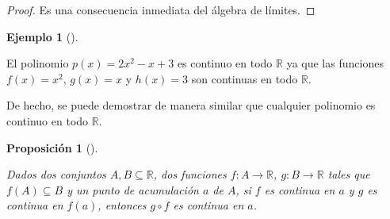 \documentclass[
  a4paper,
]{scrreport}
\theoremstyle{plain}
\theoremstyle{plain}
\theoremstyle{definition}
\theoremstyle{plain}
\newtheorem{proposition}{Proposición}[chapter]
\theoremstyle{definition}
\newtheorem{example}{Ejemplo}[chapter]
\theoremstyle{remark}
\begin{document}
\begin{tcolorbox}[enhanced jigsaw, title=\textcolor{quarto-callout-note-color}{\faInfo}\hspace{0.5em}{Demostración}, opacityback=0, titlerule=0mm, colback=white, opacitybacktitle=0.6, colbacktitle=quarto-callout-note-color!10!white, breakable, left=2mm, bottomtitle=1mm, toptitle=1mm, coltitle=black, arc=.35mm, leftrule=.75mm, toprule=.15mm, rightrule=.15mm, bottomrule=.15mm, colframe=quarto-callout-note-color-frame]

\begin{proof}

Es una consecuencia inmediata del álgebra de límites.

\end{proof}

\end{tcolorbox}

\leavevmode{}%
\begin{example}[]\label{exm-continuidad-polinomios}

El polinomio \(p(x)=2x^2-x+3\) es continuo en todo \(\mathbb{R}\) ya que
las funciones \(f(x)=x^2\), \(g(x)=x\) y \(h(x)=3\) son continuas en
todo \(\mathbb{R}\).

De hecho, se puede demostrar de manera similar que cualquier polinomio
es continuo en todo \(\mathbb{R}\).

\end{example}

\leavevmode{}%
\begin{proposition}[]\label{prp-continuidad-composicion-funciones}

Dados dos conjuntos \(A,B\subseteq \mathbb{R}\), dos funciones
\(f:A\to \mathbb{R}\), \(g:B\to \mathbb{R}\) tales que
\(f(A)\subseteq B\) y un punto de acumulación \(a\) de \(A\), si \(f\)
es continua en \(a\) y \(g\) es continua en \(f(a)\), entonces
\(g\circ f\) es continua en \(a\).

\end{proposition}
\end{document}
